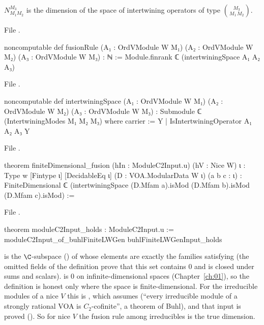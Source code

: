 \begin{definition}\label{l21:def:fusion}
$N_{M_1M_2}^{M_3}$ is the dimension of the space of intertwining operators of type $\binom{M_3}{M_1\,M_2}$.
\end{definition}
\noindent File .
\begin{leancode}
noncomputable def fusionRule (A₁ : OrdVModule W M₁) (A₂ : OrdVModule W M₂)
    (A₃ : OrdVModule W M₃) : ℕ :=
  Module.finrank ℂ (intertwiningSpace A₁ A₂ A₃)
\end{leancode}
\noindent File .
\begin{leancode}
noncomputable def intertwiningSpace (A₁ : OrdVModule W M₁) (A₂ : OrdVModule W M₂)
    (A₃ : OrdVModule W M₃) : Submodule ℂ (IntertwiningModes M₁ M₂ M₃) where
  carrier := {Y | IsIntertwiningOperator A₁ A₂ A₃ Y}
\end{leancode}
\noindent File .
\begin{leancode}
theorem finiteDimensional_fusion (hIn : ModuleC2Input.{u}) (hV : Nice W) {ι : Type w} [Fintype ι]
    [DecidableEq ι] (D : VOA.ModularData W ι) (a b c : ι) :
    FiniteDimensional ℂ
      (intertwiningSpace (D.Mfam a).isMod (D.Mfam b).isMod (D.Mfam c).isMod) :=
\end{leancode}
\noindent File .
\begin{leancode}
theorem moduleC2Input_holds : ModuleC2Input.{u} :=
  moduleC2Input_of_buhlFiniteLWGen buhlFiniteLWGenInput_holds
\end{leancode}

\begin{dictionary}
 is the $\C$-subspace () of  whose elements
are exactly the families satisfying  (the omitted fields of the definition prove that this
set contains $0$ and is closed under sums and scalars).  is $0$ on infinite-dimensional spaces
(Chapter~\ref{ch:01}), so the definition is honest only where the space is finite-dimensional. For the irreducible
modules of a nice $V$ this is , which assumes  (``every irreducible
module of a strongly rational VOA is $C_2$-cofinite'', a theorem of Buhl), and that input is proved
(). So for nice $V$ the fusion rule among irreducibles is the true dimension.
\end{dictionary}

